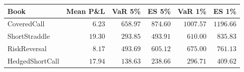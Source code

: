 \begin{tabular}{lrrrrr}
\toprule
Book & Mean P\&L & VaR 5\% & ES 5\% & VaR 1\% & ES 1\% \\
\midrule
CoveredCall & $6.23$ & $658.97$ & $874.60$ & $1007.57$ & $1196.66$ \\
ShortStraddle & $19.30$ & $293.85$ & $493.91$ & $610.00$ & $835.83$ \\
RiskReversal & $8.17$ & $493.69$ & $605.12$ & $675.00$ & $761.13$ \\
HedgedShortCall & $17.94$ & $138.63$ & $238.66$ & $296.71$ & $409.62$ \\
\bottomrule
\end{tabular}
